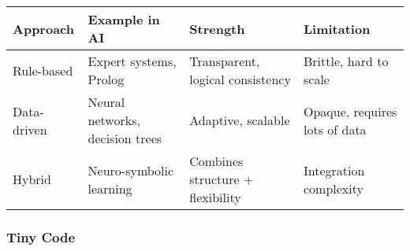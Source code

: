 \documentclass[
  letterpaper,
  DIV=11,
  numbers=noendperiod]{scrreprt}
\begin{document}
\begin{longtable}[]{@{}
  >{\raggedright\arraybackslash}p{}
  >{\raggedright\arraybackslash}p{}
  >{\raggedright\arraybackslash}p{}
  >{\raggedright\arraybackslash}p{}@{}}
\toprule\noalign{}
\begin{minipage}[b]{\linewidth}\raggedright
Approach
\end{minipage} & \begin{minipage}[b]{\linewidth}\raggedright
Example in AI
\end{minipage} & \begin{minipage}[b]{\linewidth}\raggedright
Strength
\end{minipage} & \begin{minipage}[b]{\linewidth}\raggedright
Limitation
\end{minipage} \\
\midrule\noalign{}
\endhead
\bottomrule\noalign{}
\endlastfoot
Rule-based & Expert systems, Prolog & Transparent, logical consistency &
Brittle, hard to scale \\
Data-driven & Neural networks, decision trees & Adaptive, scalable &
Opaque, requires lots of data \\
Hybrid & Neuro-symbolic learning & Combines structure + flexibility &
Integration complexity \\
\end{longtable}

\subsubsection{Tiny Code}\label{tiny-code-54}
\end{document}
